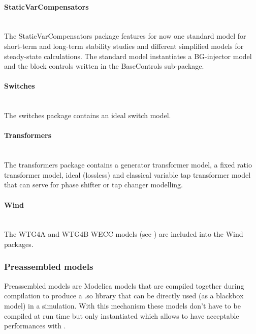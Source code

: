 \documentclass[a4paper, 12pt]{report}
\begin{document}
\paragraph{StaticVarCompensators}
~~\\

The StaticVarCompensators package features for now one standard model for short-term and long-term stability studies and different simplified models for steady-state calculations. The standard model instantiates a BG-injector model and the block controls written in the BaseControls sub-package.

\paragraph{Switches}
~~\\

The switches package contains an ideal switch model.

\paragraph{Transformers}
~~\\

The transformers package contains a generator transformer model, a fixed ratio transformer model, ideal (lossless) and classical variable tap transformer model that can serve for phase shifter or tap changer modelling.

\paragraph{Wind}
~~\\

The WTG4A and WTG4B \ac{WECC} models (see \cite{WECC}) are included into the Wind packages.

\subsubsection{Preassembled models}

Preassembled models are Modelica models that are compiled together during \Dynawo compilation to produce a .so library that can be directly used (as a blackbox model) in a simulation. With this mechanism these models don't have to be compiled at run time but only instantiated which allows to have acceptable performances with \Dynawo. \\
\end{document}

